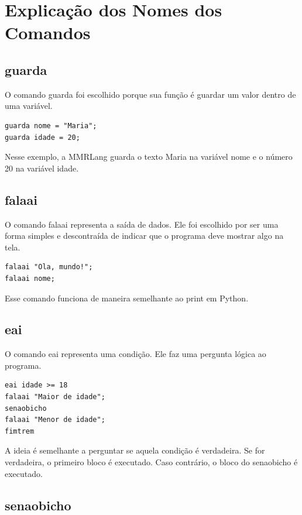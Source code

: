 \documentclass[12pt,a4paper]{article}
\begin{document}
\section{Explicação dos Nomes dos Comandos}

\subsection{guarda}

O comando guarda foi escolhido porque sua função é guardar um valor dentro de uma variável.

\begin{lstlisting}
guarda nome = "Maria";
guarda idade = 20;
\end{lstlisting}

Nesse exemplo, a MMRLang guarda o texto Maria na variável nome e o número 20 na variável idade.

\subsection{falaai}

O comando falaai representa a saída de dados. Ele foi escolhido por ser uma forma simples e descontraída de indicar que o programa deve mostrar algo na tela.

\begin{lstlisting}
falaai "Ola, mundo!";
falaai nome;
\end{lstlisting}

Esse comando funciona de maneira semelhante ao print em Python.

\subsection{eai}

O comando eai representa uma condição. Ele faz uma pergunta lógica ao programa.

\begin{lstlisting}
eai idade >= 18
falaai "Maior de idade";
senaobicho
falaai "Menor de idade";
fimtrem
\end{lstlisting}

A ideia é semelhante a perguntar se aquela condição é verdadeira. Se for verdadeira, o primeiro bloco é executado. Caso contrário, o bloco do senaobicho é executado.

\subsection{senaobicho}
\end{document}
